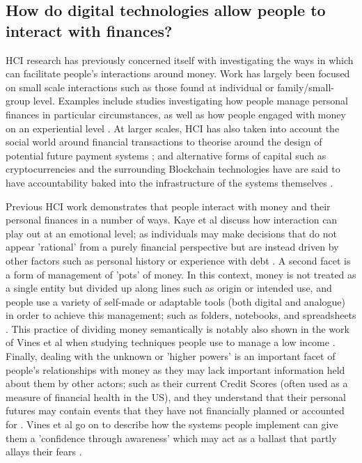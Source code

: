 \subsection{How do digital technologies allow people to interact with finances?}%
HCI research has previously concerned itself with investigating the ways in which can facilitate people's interactions around money. Work has largely been focused on small scale interactions such as those found at individual or family/small-group level. Examples include studies investigating how people manage personal finances in particular circumstances, as well as how people engaged with money on an experiential level \cite{vines_pay_2014, vines_eighty_2011}. At larger scales, HCI has also taken into account the social world around financial transactions to theorise around the design of potential future payment systems \cite{ferreira_spending_2015}; and alternative forms of capital such as cryptocurrencies and the surrounding Blockchain technologies have are said to have accountability baked into the infrastructure of the systems themselves \cite{birch_chapter_2018}.
%

Previous HCI work demonstrates that people interact with money and their personal finances in a number of ways. Kaye et al discuss how interaction can play out at an emotional level; as individuals may make decisions that do not appear 'rational' from a purely financial perspective but are instead driven by other factors such as personal history or experience with debt \cite{kaye_money_2014}. A second facet is a form of management of 'pots' of money. In this context, money is not treated as a single entity but divided up along lines such as origin or intended use, and people use a variety of self-made or adaptable tools (both digital and analogue) in order to achieve this management; such as folders, notebooks, and spreadsheets \cite{kaye_money_2014}. This practice of dividing money semantically is notably also shown in the work of Vines et al when studying techniques people use to manage a low income \cite{vines_pay_2014}. Finally, dealing with the unknown or 'higher powers' is an important facet of people's relationships with money as they may lack important information held about them by other actors; such as their current Credit Scores (often used as a measure of financial health in the US), and they understand that their personal futures may contain events that they have not financially planned or accounted for \cite{kaye_money_2014}. Vines et al go on to describe how the systems people implement can give them a 'confidence through awareness' which may act as a ballast that partly allays their fears \cite{vines_pay_2014}.


